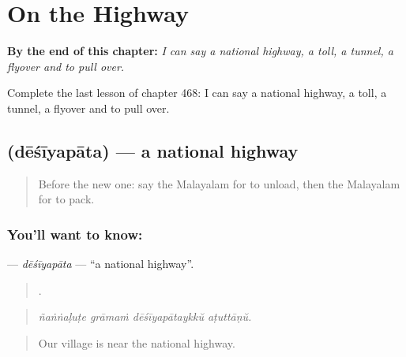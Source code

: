 
\chapter{On the Highway}
\label{ch:ml-on-the-highway}

\begin{chapteropening}
\textbf{By the end of this chapter:} \emph{I can say a national highway, a toll, a tunnel, a flyover and to pull over.}

Complete the last lesson of chapter 468: I can say a national highway, a toll, a tunnel, a flyover and to pull over.
\end{chapteropening}

\section[\texorpdfstring{\ml{ദേശീയപാത} (dēśīyapāta)}{ദേശീയപാത (dēśīyapāta)}]{ (dēśīyapāta) — a national highway}

\label{lesson:ML-C468-desiyapata}



\begin{quote}
Before the new one: say the Malayalam for to unload, then the Malayalam for to pack.
\end{quote}

\subsection*{You'll want to know: }
\textbf{} — \emph{dēśīyapāta} — \textquotedblleft{}a national highway\textquotedblright{}.

\begin{quote}
   .
\end{quote}

\begin{quote}
\emph{ñaṅṅaḷuṭe grāmaṁ dēśīyapātaykkŭ aṭuttāṇŭ.}
\end{quote}

\begin{quote}
Our village is near the national highway.
\end{quote}

